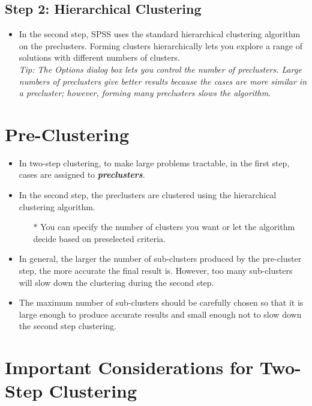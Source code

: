 \documentclass[a4paper,12pt]{article}
\begin{document}
	\subsection{Step 2:	Hierarchical Clustering}
\begin{itemize}
\item In the second step, SPSS uses the standard hierarchical clustering algorithm on the
preclusters. Forming clusters hierarchically lets you explore a range of solutions with
different numbers of clusters.
\\ \textit{Tip: The Options dialog box lets you control the number of preclusters. Large numbers
	of preclusters give better results because the cases are more similar in a precluster;
	however, forming many preclusters slows the algorithm}.


\end{itemize}



\section{Pre-Clustering}
\begin{itemize}
	\item In two-step clustering, to make large problems tractable, in the first step, cases are
	assigned to \textbf{\textit{preclusters}}. 
	\item In the second step, the preclusters are clustered using the
	hierarchical clustering algorithm. \begin{itemize}
		\item[$\ast$] You can specify the number of clusters you want or
	let the algorithm decide based on preselected criteria.
	\end{itemize}
	\item In general, the larger the number of sub-clusters produced by the pre-cluster step, the more accurate the final result is. However, too many sub-clusters will slow down the clustering during the second step.
	
	\item The maximum number of sub-clusters should be carefully chosen so that it is large enough to produce accurate results and small enough not to slow down the second step clustering.
	
\end{itemize}



\section{Important Considerations for Two-Step Clustering}
\end{document}
